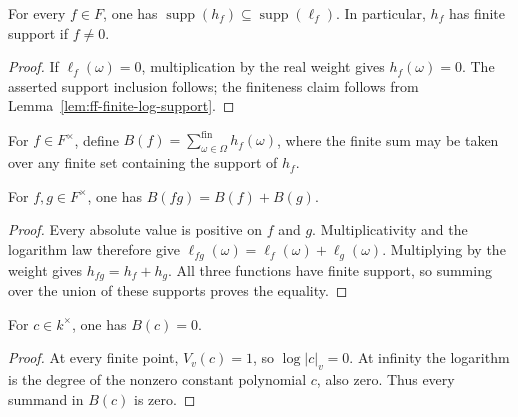 \begin{lemma}\label{lem:ff-weighted-log-support}
\leanok
{}
For every $f\in F$, one has
$\operatorname{supp}(h_f)\subseteq\operatorname{supp}(\ell_f)$.
In particular, $h_f$ has finite support if $f\ne0$.
\end{lemma}
\begin{proof}
If $\ell_f(\omega)=0$, multiplication by the real weight gives
$h_f(\omega)=0$. The asserted support inclusion follows; the finiteness
claim follows from Lemma~\ref{lem:ff-finite-log-support}.
\end{proof}

For $f\in F^\times$, define
$B(f)=\sum_{\omega\in\Omega}^{\mathrm{fin}}h_f(\omega)$,
where the finite sum may be taken over any finite set containing the
support of $h_f$.

\begin{lemma}
\label{lem:ff-product-log-additive}
\leanok
{}
For $f,g\in F^\times$, one has $B(fg)=B(f)+B(g)$.
\end{lemma}
\begin{proof}
Every absolute value is positive on $f$ and $g$. Multiplicativity and
the logarithm law therefore give
$\ell_{fg}(\omega)=\ell_f(\omega)+\ell_g(\omega)$.
Multiplying by the weight gives $h_{fg}=h_f+h_g$. All three functions
have finite support, so summing over the union of these supports proves
the equality.
\end{proof}

\begin{lemma}\label{lem:ff-constant-product-formula}
\leanok
{}
For $c\in k^\times$, one has $B(c)=0$.
\end{lemma}
\begin{proof}
At every finite point, $V_v(c)=1$, so $\log|c|_v=0$. At infinity the
logarithm is the degree of the nonzero constant polynomial $c$, also
zero. Thus every summand in $B(c)$ is zero.
\end{proof}

